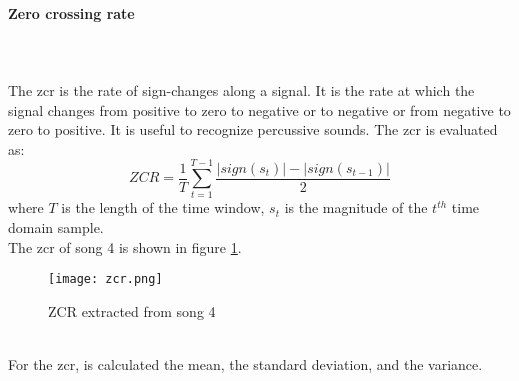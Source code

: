 \paragraph{Zero crossing rate}
\mbox{} \\ \\
The \gls{zcr}  is the rate of sign-changes along a signal. It is the rate at which the signal changes from positive to zero to negative or to negative or from negative to zero to positive. It is useful to recognize percussive sounds.
The \gls{zcr} is evaluated as:
\begin{equation}
	ZCR=\dfrac{1}{T} \sum_{t=1}^{T-1}{\dfrac{|sign(s_t)|-|sign(s_{t-1})|}{2}}
\end{equation}
where $T$ is the length of the time window, $s_t$ is the magnitude of the $t^{th}$ time domain sample.
\\
The \gls{zcr} of song 4 is shown in figure \ref{fig:zcr}.
\begin{figure}[h]
    \centering
    \texttt{[image: zcr.png]} 
	\caption{ZCR extracted from song 4}
    \label{fig:zcr}
\end{figure}
\\
For the \gls{zcr}, is calculated the mean, the standard deviation, and the variance.

